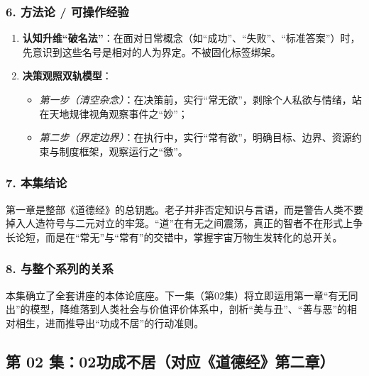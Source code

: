\subsubsection{6. 方法论 / 可操作经验}
\begin{enumerate}
    \item \textbf{认知升维“破名法”}：在面对日常概念（如“成功”、“失败”、“标准答案”）时，先意识到这些名号是相对的人为界定。不被固化标签绑架。
    \item \textbf{决策观照双轨模型}：
    \begin{itemize}
        \item \emph{第一步（清空杂念）}：在决策前，实行“常无欲”，剥除个人私欲与情绪，站在天地规律视角观察事件之“妙”；
        \item \emph{第二步（界定边界）}：在执行中，实行“常有欲”，明确目标、边界、资源约束与制度框架，观察运行之“徼”。
    \end{itemize}
\end{enumerate}

\subsubsection{7. 本集结论}
第一章是整部《道德经》的总钥匙。老子并非否定知识与言语，而是警告人类不要掉入人造符号与二元对立的牢笼。“道”在有无之间震荡，真正的智者不在形式上争长论短，而是在“常无”与“常有”的交错中，掌握宇宙万物生发转化的总开关。

\subsubsection{8. 与整个系列的关系}
本集确立了全套讲座的本体论底座。下一集（第02集）将立即运用第一章“有无同出”的模型，降维落到人类社会与价值评价体系中，剖析“美与丑”、“善与恶”的相对相生，进而推导出“功成不居”的行动准则。

\clearpage

\subsection{第 02 集：02功成不居（对应《道德经》第二章）}
\label{sec:ep02}

